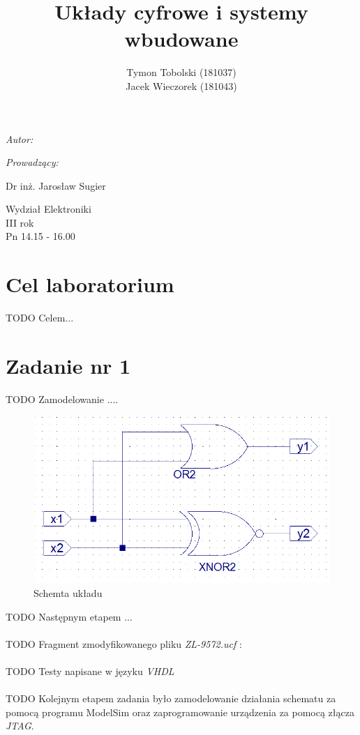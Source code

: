 \documentclass[wide,a4paper,titlepage,12pt] {article}
\title{Układy cyfrowe i systemy wbudowane}
\author{Tymon Tobolski (181037)\\ Jacek Wieczorek (181043)}
\makeatletter
\renewcommand{\maketitle}{
\begin{titlepage}
  \begin{center}
    \vspace*{3cm}
    \LARGE \@title \par
    \vspace{2cm}
    \textit{\small Autor:}\par
    \normalsize \@author\par \normalsize
    \vspace{3cm}
    \textit{\small Prowadzący:}\par
    Dr inż. Jarosław Sugier \par
    \vspace{2cm}
    Wydział Elektroniki\\ III rok\\ Pn 14.15 - 16.00\par
    \vspace{4cm}
    \small \@date
  \end{center}
\end{titlepage}
}
\makeatother
\begin{document}
\maketitle
  \section{Cel laboratorium}
  TODO
  Celem...
  \section{Zadanie nr 1}
  TODO
  Zamodelowanie .... \newline
      \begin{figure}[htbp]
	 \begin{center}
         \includegraphics[scale=0.7]{pic1.PNG}
      \caption{Schemta układu}
      \end{center}
  \end{figure}
  TODO
  Następnym etapem ...
	\newpage
	\paragraph{}
	TODO
	Fragment zmodyfikowanego pliku \textit{ZL-9572.ucf} :
	

	\paragraph{}
	TODO
	Testy napisane w języku \textit{VHDL}
	


  \paragraph{}
  TODO
  Kolejnym etapem zadania było zamodelowanie działania schematu za pomocą programu ModelSim oraz zaprogramowanie urządzenia za pomocą złącza \textit{JTAG}.
\end{document}
